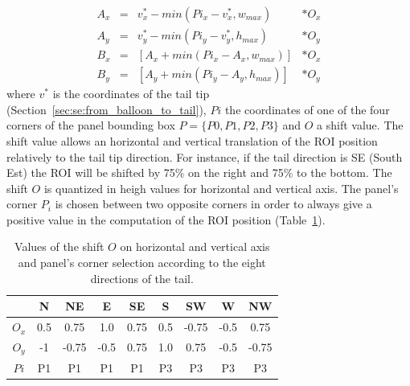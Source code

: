 \begin{equation}
  \label{eq:se:roi_position_around_balloon}
  \begin{array}{rccl} 
	  A_x & = & v^*_x - min(Pi_x - v^*_x, w_{max}) & * O_x \\ 
	  A_y & = & v^*_y - min(Pi_y - v^*_y, h_{max}) & * O_y \\ 
	  B_x & = & \left[ A_x + min(Pi_x - A_x, w_{max}) \right] & * O_x \\ 
	  B_y & = & \left[ A_y + min(Pi_y - A_y, h_{max}) \right] & * O_y
  \end{array} 
\end{equation}
where $v^*$ is the coordinates of the tail tip (Section~\ref{sec:se:from_balloon_to_tail}), $Pi$ the coordinates of one of the four corners of the panel bounding box $P=\{P0, P1, P2, P3\}$ and $O$ a shift value.
The shift value allows an horizontal and vertical translation of the ROI position relatively to the tail tip direction.
For instance, if the tail direction is SE (South Est) the ROI will be shifted by 75\% on the right and 75\% to the bottom.
The shift $O$ is quantized in heigh values for horizontal and vertical axis.
The panel's corner $P_i$ is chosen between two opposite corners in order to always give a positive value in the computation of the ROI position (Table~\ref{tab:se:offset_panel_corner}).

  \begin{table}[ht]
    \normalsize

    \centering
    \caption{Values of the shift $O$ on horizontal and vertical axis and panel's corner selection according to the eight directions of the tail.}
    \setlength{\tabcolsep}{.45em}
    \begin{tabular}{|c|c|c|c|c|c|c|c|c|}

          \hline
	      &  N  & NE  & E  & SE & S & SW & W & NW   \\
	      \hline
	      $O_x$   & 0.5  & 0.75 & 1.0  & 0.75 & 0.5 & -0.75& -0.5 & 0.75  \\
	      \hline
	      $O_y$   & -1   & -0.75& -0.5 & 0.75 & 1.0 & 0.75 & -0.5 & -0.75  \\
	      \hline
	      $Pi$    & P1   & P1   & P1   & P1   & P3  & P3   & P3   & P3   \\
          \hline
        \end{tabular}
    \label{tab:se:offset_panel_corner}
  \end{table}%


